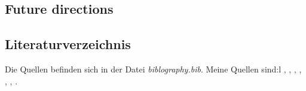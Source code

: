 \documentclass[conference]{IEEEtran}
\begin{document}
	\subsection{Future directions}

\subsection{Literaturverzeichnis}
Die Quellen befinden sich in der Datei \textit{biblography.bib}. 
Meine Quellen sind:l \cite{50years}, \cite{ArmManual}, \cite{hennessy2012computer}, \cite{WisconsinMadison2016} \cite{drechsler2020enhanced}, \cite{Asanovic2016}, \cite{IEEE2018} \cite{Dirvin2019}, \cite{Bandic2019}.



\end{document}

